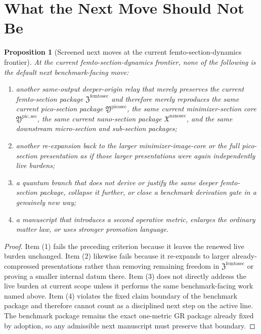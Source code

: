 \documentclass[11pt]{article}
\newcommand{\NanoSectionPackage}{\mathfrak X^{\mathrm{nanosec}}}
\newcommand{\PicoSectionPackage}{\mathfrak Y^{\mathrm{picosec}}}
\newcommand{\PicoMinSectionCore}{\mathfrak Y^{\mathrm{pic,sec}}}
\newcommand{\FemtoSectionPackage}{\mathfrak Z^{\mathrm{femtosec}}}
\newtheorem{proposition}{Proposition}
\begin{document}
\section{What the Next Move Should Not Be}

\begin{proposition}[Screened next moves at the current femto-section-dynamics frontier]
At the current femto-section-dynamics frontier, none of the following is the default next benchmark-facing move:
\begin{enumerate}
    \item another same-output deeper-origin relay that merely preserves the current femto-section package \(\FemtoSectionPackage\) and therefore merely reproduces the same current pico-section package \(\PicoSectionPackage\), the same current minimizer-section core \(\PicoMinSectionCore\), the same current nano-section package \(\NanoSectionPackage\), and the same downstream micro-section and sub-section packages;
    \item another re-expansion back to the larger minimizer-image-core or the full pico-section presentation as if those larger presentations were again independently live burdens;
    \item a quantum branch that does not derive or justify the same deeper femto-section package, collapse it further, or close a benchmark derivation gate in a genuinely new way;
    \item a manuscript that introduces a second operative metric, enlarges the ordinary matter law, or uses stronger promotion language.
\end{enumerate}
\end{proposition}

\begin{proof}
Item (1) fails the preceding criterion because it leaves the renewed live burden unchanged. Item (2) likewise fails because it re-expands to larger already-compressed presentations rather than removing remaining freedom in \(\FemtoSectionPackage\) or proving a smaller internal datum there. Item (3) does not directly address the live burden at current scope unless it performs the same benchmark-facing work named above. Item (4) violates the fixed claim boundary of the benchmark package and therefore cannot count as a disciplined next step on the active line. The benchmark package remains the exact one-metric GR package already fixed by adoption, so any admissible next manuscript must preserve that boundary.
\end{proof}
\end{document}
